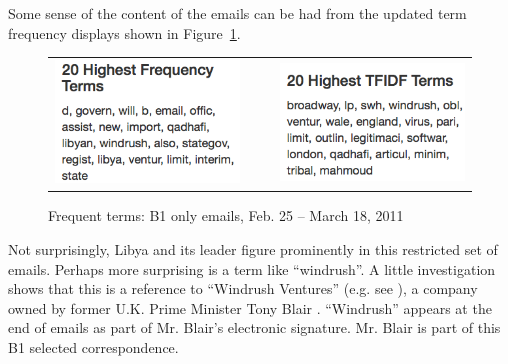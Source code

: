 \documentclass[journal]{vgtc}                %
\begin{document}
Some sense of the content of the emails can be had from the updated term frequency displays shown in Figure~\ref{fig:TermFreqB1LibyaBuildup}.
\begin{figure}[h]
\begin{center}
\begin{tabular}{ccc}
\includegraphics[width=0.4\linewidth]{TFIDFB1LibyaBuildup} &
$~~~~$ &
\includegraphics[width=0.4\linewidth]{TermFreqB1LibyaBuildup} 
\end{tabular}
\caption{Frequent terms: B1 only emails, Feb. 25 -- March 18, 2011}
\label{fig:TermFreqB1LibyaBuildup}
\end{center}
\end{figure}
Not surprisingly,  Libya and its leader figure prominently in this restricted set of emails.  
Perhaps more surprising is a term like ``windrush''.  A little investigation shows that this is a reference to ``Windrush Ventures'' (e.g. see  \cite{windrushTelegraph, windrushGuardian}),  a company owned by former U.K. Prime Minister Tony Blair .  ``Windrush'' appears at the end of emails as part of Mr. Blair's electronic signature.   
Mr. Blair is part of this B1 selected correspondence.
\end{document}
